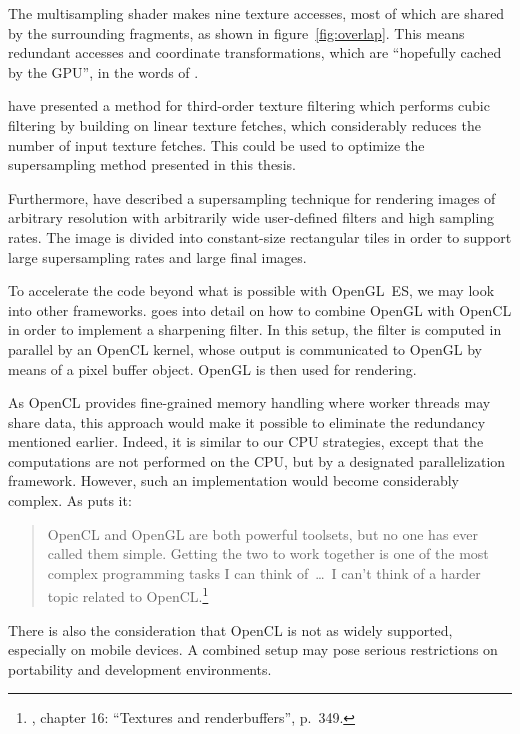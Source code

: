 \documentclass[english,12pt]{ifimaster}
\begin{document}
The multisampling shader makes nine texture accesses, most of which
are shared by the surrounding fragments, as shown in
figure~\ref{fig:overlap}. This means redundant accesses and coordinate
transformations, which are ``hopefully cached by the GPU'', in the
words of \citet{bjorke04:-filter}.

\citet{sigg05:-filtering} have presented a method for third-order
texture filtering which performs cubic filtering by building on linear
texture fetches, which considerably reduces the number of input
texture fetches. This could be used to optimize the
supersampling method presented in this thesis.

Furthermore, \citet{wexler05:-rasterization} have described a
supersampling technique for rendering images of arbitrary resolution
with arbitrarily wide user-defined filters and high sampling rates.
The image is divided into constant-size rectangular tiles in order to
support large supersampling rates and large final images.

To accelerate the code beyond what is possible with OpenGL~ES, we may
look into other frameworks. \citet{scarpino12:-opencl} goes into
detail on how to combine OpenGL with OpenCL in order to implement a
sharpening filter. In this setup, the filter is computed in parallel
by an OpenCL kernel, whose output is communicated to OpenGL by means
of a pixel buffer object. OpenGL is then used for rendering.

As OpenCL provides fine-grained memory handling where worker threads
may share data, this approach would make it possible to eliminate the
redundancy mentioned earlier. Indeed, it is similar to our CPU
strategies, except that the computations are not performed on the CPU,
but by a designated parallelization framework. However, such an
implementation would become considerably complex. As
\citeauthor{scarpino12:-opencl} puts it:
\begin{quote}
  OpenCL and OpenGL are both powerful toolsets, but no one has ever
  called them simple. Getting the two to work together is one of the
  most complex programming tasks I can think of~\dots\ I can't think
  of a harder topic related to
  OpenCL.\footnote{\citet{scarpino12:-opencl}, chapter 16: ``Textures
    and renderbuffers'', p.~349.}
\end{quote}
There is also the consideration that OpenCL is not as widely
supported, especially on mobile devices. A combined setup may pose
serious restrictions on portability and development environments.
\end{document}
